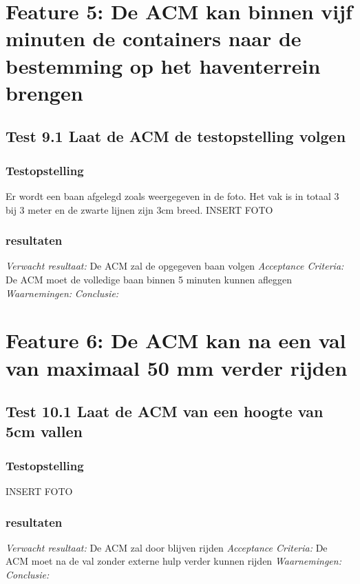 \documentclass{article}
\begin{document}
\section{Feature 5: De ACM kan binnen vijf minuten de containers naar de bestemming op het haventerrein brengen}
\subsection{Test 9.1 Laat de ACM de testopstelling volgen}
\subsubsection{Testopstelling}
Er wordt een baan afgelegd zoals weergegeven in de foto. Het vak is in totaal 3 bij 3 meter en de zwarte lijnen zijn 3cm breed. 
INSERT FOTO
\subsubsection{resultaten}
\textit{Verwacht resultaat: }De ACM zal de opgegeven baan volgen
\newline
\textit{Acceptance Criteria: }De ACM moet de volledige baan binnen 5 minuten kunnen afleggen
\newline
\textit{Waarnemingen: }
\newline
\textit{Conclusie: }

\section{Feature 6: De ACM kan na een val van maximaal 50 mm verder rijden}
\subsection{Test 10.1 Laat de ACM van een hoogte van 5cm vallen}
\subsubsection{Testopstelling}

INSERT FOTO
\subsubsection{resultaten}
\textit{Verwacht resultaat: }De ACM zal door blijven rijden 
\newline
\textit{Acceptance Criteria: }De ACM moet na de val zonder externe hulp verder kunnen rijden
\newline
\textit{Waarnemingen: }
\newline
\textit{Conclusie: }
\end{document}
